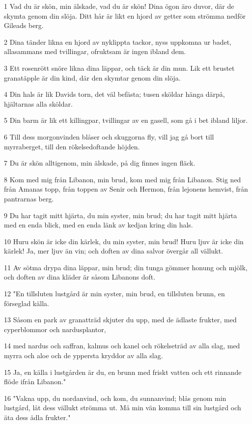 \par 1 Vad du är skön, min älskade, vad du är skön! Dina ögon äro duvor, där de skymta genom din slöja. Ditt hår är likt en hjord av getter som strömma nedför Gileads berg.
\par 2 Dina tänder likna en hjord av nyklippta tackor, nyss uppkomna ur badet, allasammans med tvillingar, ofruktsam är ingen ibland dem.
\par 3 Ett rosenrött snöre likna dina läppar, och täck är din mun. Lik ett brustet granatäpple är din kind, där den skymtar genom din slöja.
\par 4 Din hals är lik Davids torn, det väl befästa; tusen sköldar hänga därpå, hjältarnas alla sköldar.
\par 5 Din barm är lik ett killingpar, tvillingar av en gasell, som gå i bet ibland liljor.
\par 6 Till dess morgonvinden blåser och skuggorna fly, vill jag gå bort till myrraberget, till den rökelsedoftande höjden.
\par 7 Du är skön alltigenom, min älskade, på dig finnes ingen fläck.
\par 8 Kom med mig från Libanon, min brud, kom med mig från Libanon. Stig ned från Amanas topp, från toppen av Senir och Hermon, från lejonens hemvist, från pantrarnas berg.
\par 9 Du har tagit mitt hjärta, du min syster, min brud; du har tagit mitt hjärta med en enda blick, med en enda länk av kedjan kring din hals.
\par 10 Huru skön är icke din kärlek, du min syster, min brud! Huru ljuv är icke din kärlek! Ja, mer ljuv än vin; och doften av dina salvor övergår all vällukt.
\par 11 Av sötma drypa dina läppar, min brud; din tunga gömmer honung och mjölk, och doften av dina kläder är såsom Libanons doft.
\par 12 "En tillsluten lustgård är min syster, min brud, en tillsluten brunn, en förseglad källa.
\par 13 Såsom en park av granatträd skjuter du upp, med de ädlaste frukter, med cyperblommor och nardusplantor,
\par 14 med nardus och saffran, kalmus och kanel och rökelseträd av alla slag, med myrra och aloe och de yppersta kryddor av alla slag.
\par 15 Ja, en källa i lustgården är du, en brunn med friskt vatten och ett rinnande flöde ifrån Libanon."
\par 16 "Vakna upp, du nordanvind, och kom, du sunnanvind; blås genom min lustgård, låt dess vällukt strömma ut. Må min vän komma till sin lustgård och äta dess ädla frukter."


